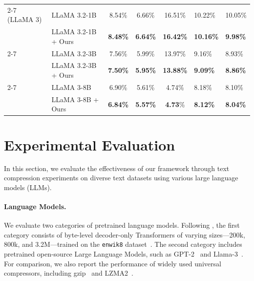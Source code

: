 \documentclass[11pt]{article}
\begin{document}
\begin{table}[htb]
{\begin{tabular}{llcccll}
        \cmidrule(lr){2-7}
        (LLaMA 3)& LLaMA 3.2-1B& 8.54\%& 6.66\%& 16.51\% & 10.22\%&10.05\%\\
         & LLaMA 3.2-1B + Ours& \textbf{8.48\%}& \textbf{6.64\%}& \textbf{16.42\%} & \textbf{10.16\%}& \textbf{9.98\%} \\
        \cmidrule(lr){2-7}
        & LLaMA 3.2-3B& 7.56\%& 5.99\%& 13.97\% & 9.16\%&8.93\%\\
        & LLaMA 3.2-3B + Ours& \textbf{7.50\%}& \textbf{5.95\%}& \textbf{13.88\%} & \textbf{9.09\%}& \textbf{8.86\%} \\
        \cmidrule(lr){2-7}
        & LLaMA 3-8B&  6.90\%& 5.61\% & 4.74\% & 8.18\% &8.10\%\\
        & LLaMA 3-8B + Ours& \textbf{6.84\%}& \textbf{5.57\%} & \textbf{4.73}\% & \textbf{8.12\%} & \textbf{8.04\%} \\
        \bottomrule
    \end{tabular}
    }
\end{table}
\section{Experimental Evaluation}
\label{sec:results}

In this section, we evaluate the effectiveness of our framework through text compression experiments on diverse text datasets using various large language models (LLMs).

\paragraph{Language Models.} We evaluate two categories of pretrained language models. 
Following \citet{lmic}, the first category consists of byte-level decoder-only Transformers of varying sizes—200k, 800k, and 3.2M—trained on the \texttt{enwik8} dataset~\citep{vaswani2017attention}. 
The second category includes pretrained open-source Large Language Models, such as GPT-2~\citep{gpt2} and Llama-3~\citep{llama3}. 
For comparison, we also report the performance of widely used universal compressors, including gzip~\citep{gzip} and LZMA2~\citep{lzma2}.
\end{document}

